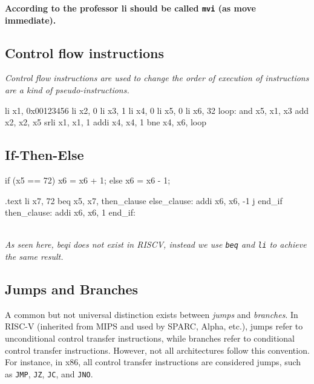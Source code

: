 \textbf{According to the professor li should be called \texttt{mvi} (as move immediate).}

\subsection{Control flow instructions}
\textit{Control flow instructions are used to change the order of execution of instructions are a kind of pseudo-instructions.}
\begin{assembly}
    li x1, 0x00123456
    li x2, 0
    li x3, 1
    li x4, 0
    li x5, 0
    li x6, 32
loop: and x5, x1, x3
    add x2, x2, x5
    srli x1, x1, 1
    addi x4, x4, 1
    bne x4, x6, loop
\end{assembly}

\subsection{If-Then-Else}
\begin{minipage}[htp]{0.4\textwidth}
\begin{cc}
if (x5 == 72) {
    x6 = x6 + 1;
    } else {
    x6 = x6 - 1;
}
\end{cc}    
\end{minipage}
\hfill
\vline
\hfill
\begin{minipage}[htp]{0.4\textwidth}
\begin{assembly}
.text
    li x7, 72
    beq x5, x7, then_clause
else_clause:
    addi x6, x6, -1
    j end_if
then_clause:
    addi x6, x6, 1
end_if:
\end{assembly}
\end{minipage} \\
\vspace*{5px}
\textit{As seen here, beqi does not exist in RISCV, instead we use \texttt{beq} and \texttt{li} to achieve the same result.}
\subsection{Jumps and Branches}
A common but not universal distinction exists between \emph{jumps} and \emph{branches}. In RISC-V (inherited from MIPS and used by SPARC, Alpha, etc.), jumps refer to unconditional control transfer instructions, while branches refer to conditional control transfer instructions. However, not all architectures follow this convention. For instance, in x86, all control transfer instructions are considered jumps, such as \texttt{JMP}, \texttt{JZ}, \texttt{JC}, and \texttt{JNO}.

